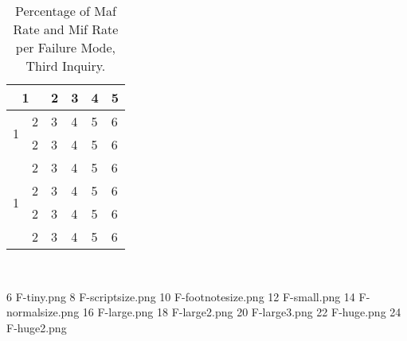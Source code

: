 \begin{table}[!htbp]
\begin{threeparttable}
\renewcommand{\arraystretch}{1.3}
\caption{Percentage of Maf Rate and Mif Rate per Failure Mode, Third Inquiry.}
\label{table:Percentage of Maf Rate}
\centering
\small

\begin{tabular}{| l | c | l | l | l | l |} \hline
\multicolumn{2}{|c|}{1} & 2 & 3 & 4 & 5 \\ \hline
\multirow{2}{*}{1}		& 2 & 3 & 4 & 5 & 6 \\ \cline{2-6}
				 		& 2 & 3 & 4 & 5 & 6 \\ \hline
				 		
\multirow{4}{*}{1}		& 2 & 3 & 4 & 5 & 6 \\ \cline{2-6}
						& 2 & 3 & 4 & 5 & 6 \\ \cline{2-6}
						& 2 & 3 & 4 & 5 & 6 \\ \cline{2-6}
				 		& 2 & 3 & 4 & 5 & 6 \\ \hline
\end{tabular}
\end{threeparttable}
\end{table}

\\
    
    
6  \tiny	F-tiny.png
8  \scriptsize	F-scriptsize.png
10 \footnotesize	F-footnotesize.png
12 \small	F-small.png
14 \normalsize	F-normalsize.png
16 \large	F-large.png
18 \Large	F-large2.png
20 \LARGE	F-large3.png
22 \huge	F-huge.png
24 \Huge	F-huge2.png

